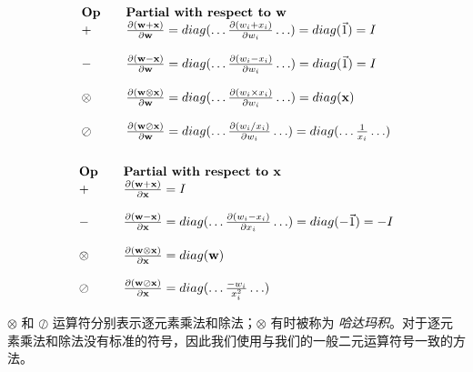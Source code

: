 \documentclass[lang=cn,newtx,10pt,scheme=chinese]{elegantbook}
\begin{document}
\[
\begin{array}{lllllllll}
        \text{\bf{Op}} &  & {\text{\bf Partial with respect to }} \mathbf{w} \\
        + &  & \frac{\partial (\mathbf{w+x})}{\partial \mathbf{w}} = diag(\ldots \frac{\partial (w_i + x_i)}{\partial w_i} \ldots) = diag(\vec{1}) = I \\\\
        - &  & \frac{\partial (\mathbf{w-x})}{\partial \mathbf{w}}  =  diag(\ldots\frac{\partial (w_i - x_i)}{\partial w_i}\ldots) =  diag(\vec{1})  =  I \\\\
        \otimes &  & \frac{\partial (\mathbf{w \otimes x})}{\partial \mathbf{w}}  =  diag(\ldots\frac{\partial (w_i \times x_i)}{\partial w_i} \ldots)  =  diag(\mathbf{x}) \\\\
        \oslash &  & \frac{\partial (\mathbf{w \oslash x})}{\partial \mathbf{w}}  =  diag(\ldots\frac{\partial (w_i / x_i)}{\partial w_i}\ldots)  =  diag(\ldots \frac{1}{x_i} \ldots) \\\\
\end{array}
\]\[
\begin{array}{lllllllll}
        \text{\bf{Op}} &  &  {\text{\bf Partial with respect to }}\mathbf{x}\\
        + &  & \frac{\partial (\mathbf{w+x})}{\partial \mathbf{x}} =  I\\\\
        - &  & \frac{\partial (\mathbf{w-x})}{\partial \mathbf{x}}  =  diag(\ldots\frac{\partial (w_i - x_i)}{\partial x_i}\ldots)  =  diag(-\vec{1})  =  -I \\\\
        \otimes &  &  \frac{\partial (\mathbf{w \otimes x})}{\partial \mathbf{x}}  =  diag(\mathbf{w})\\\\
        \oslash &  &  \frac{\partial (\mathbf{w \oslash x})}{\partial \mathbf{x}}  =  diag(\ldots \frac{-w_i}{x_i^2} \ldots)\\
\end{array}
\]

$\otimes$ 和 $\oslash$ 运算符分别表示逐元素乘法和除法；$\otimes$ 有时被称为 {\em 哈达玛积}。对于逐元素乘法和除法没有标准的符号，因此我们使用与我们的一般二元运算符号一致的方法。
\end{document}
